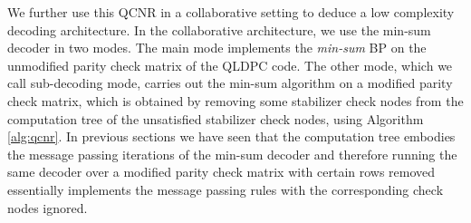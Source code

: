 \documentclass[%
 reprint,
 amsmath,amssymb,
 aps,
pra,
showkeys,
]{revtex4-2}
\begin{document}
We further use this QCNR in a collaborative setting to deduce a low complexity decoding architecture.
In the collaborative architecture, we use the min-sum decoder in two modes.
The main mode implements the \textit{min-sum} BP on the unmodified parity check matrix of the QLDPC code.
The other mode, which we call sub-decoding mode, carries out the min-sum algorithm on a modified parity check matrix, which is obtained by removing some stabilizer check nodes from the computation tree of the unsatisfied stabilizer check nodes, using Algorithm \ref{alg:qcnr}.
In previous sections we have seen that the computation tree embodies the message passing iterations of the min-sum decoder and therefore running the same decoder over a modified parity check matrix with certain rows removed essentially implements the message passing rules with the corresponding check nodes ignored.
\end{document}
